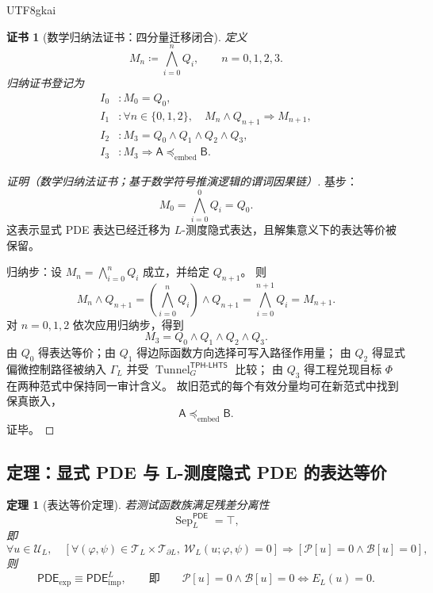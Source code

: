 \documentclass[12pt]{article}
\newtheorem{theorem}{定理}[section]
\newtheorem{Certificate}{证书}[section]
\newcommand{\DefEq}{\coloneqq}
\newcommand{\Pcal}{\mathcal P}
\newcommand{\Bcal}{\mathcal B}
\newcommand{\Ucal}{\mathcal U}
\newcommand{\TPHLHTS}{\ensuremath{\mathsf{TPH\mbox{-}LHTS}}}
\newcommand{\PDE}{\ensuremath{\mathsf{PDE}}}
\DeclareMathOperator{\Tunnel}{Tunnel}
\DeclareMathOperator{\Sep}{Sep}
\begin{document}
\begin{CJK*}{UTF8}{gkai}
\begin{Certificate}[数学归纳法证书：四分量迁移闭合]
\label{cert:tex58-paradigm-component-induction}
定义
\[
  M_n
  \DefEq
  \bigwedge_{i=0}^{n}Q_i,
  \qquad
  n=0,1,2,3.
\]
归纳证书登记为
\[
\begin{aligned}
  I_0 &: M_0=Q_0,\\
  I_1 &: \forall n\in\{0,1,2\},\quad M_n\wedge Q_{n+1}\Rightarrow M_{n+1},\\
  I_2 &: M_3=Q_0\wedge Q_1\wedge Q_2\wedge Q_3,\\
  I_3 &: M_3\Rightarrow
  \mathsf A\preccurlyeq_{\mathrm{embed}}\mathsf B.
\end{aligned}
\]
\end{Certificate}

\begin{proof}[证明（数学归纳法证书；基于数学符号推演逻辑的谓词因果链）]
基步：
\[
  M_0=\bigwedge_{i=0}^{0}Q_i=Q_0.
\]
这表示显式 PDE 表达已经迁移为 \(L\)-测度隐式表达，且解集意义下的表达等价被保留。

归纳步：设 \(M_n=\bigwedge_{i=0}^{n}Q_i\) 成立，并给定 \(Q_{n+1}\)。
则
\[
  M_n\wedge Q_{n+1}
  =
  \left(\bigwedge_{i=0}^{n}Q_i\right)\wedge Q_{n+1}
  =
  \bigwedge_{i=0}^{n+1}Q_i
  =
  M_{n+1}.
\]
对 \(n=0,1,2\) 依次应用归纳步，得到
\[
  M_3=Q_0\wedge Q_1\wedge Q_2\wedge Q_3.
\]
由 \(Q_0\) 得表达等价；由 \(Q_1\) 得边际函数方向选择可写入路径作用量；
由 \(Q_2\) 得显式偏微控制路径被纳入 \(\Gamma_L\) 并受 \(\Tunnel_G^{\TPHLHTS}\) 比较；
由 \(Q_3\) 得工程兑现目标 \(\Phi\) 在两种范式中保持同一审计含义。
故旧范式的每个有效分量均可在新范式中找到保真嵌入，
\[
  \mathsf A\preccurlyeq_{\mathrm{embed}}\mathsf B.
\]
证毕。
\end{proof}

\subsection{定理：显式 PDE 与 L-测度隐式 PDE 的表达等价}
\label{subsec:tex58-expression-equivalence}

\begin{theorem}[表达等价定理]
\label{thm:tex58-explicit-implicit-expression-equivalence}
若测试函数族满足残差分离性
\[
  \Sep_L^{\PDE}=\top,
\]
即
\[
  \forall u\in\Ucal_L,\quad
  \left[
  \forall(\varphi,\psi)\in\mathcal T_L\times\mathcal T_{\partial L},\
  \mathcal W_L(u;\varphi,\psi)=0
  \right]
  \Rightarrow
  \left[
  \Pcal[u]=0\wedge\Bcal[u]=0
  \right],
\]
则
\[
  \PDE_{\mathrm{exp}}
  \equiv
  \PDE_{\mathrm{imp}}^L,
  \qquad
  \text{即}
  \qquad
  \Pcal[u]=0\wedge\Bcal[u]=0
  \Longleftrightarrow
  E_L(u)=0.
\]
\end{theorem}


\end{CJK*}
\end{document}
